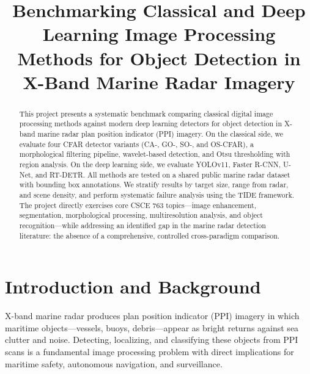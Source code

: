 \documentclass[conference]{IEEEtran}
\title{Benchmarking Classical and Deep Learning Image Processing Methods for Object Detection in X-Band Marine Radar Imagery}
\author{
\IEEEauthorblockN{JC Vaught and Ty Dangerfield}
\IEEEauthorblockA{CSCE 763: Digital Image Processing --- Spring 2026\\
University of South Carolina\\
\{jvaught, tdangerf\}@email.sc.edu}
}
\begin{document}
\maketitle

\begin{abstract}
This project presents a systematic benchmark comparing classical digital image processing methods against modern deep learning detectors for object detection in X-band marine radar plan position indicator (PPI) imagery. On the classical side, we evaluate four CFAR detector variants (CA-, GO-, SO-, and OS-CFAR), a morphological filtering pipeline, wavelet-based detection, and Otsu thresholding with region analysis. On the deep learning side, we evaluate YOLOv11, Faster R-CNN, U-Net, and RT-DETR. All methods are tested on a shared public marine radar dataset with bounding box annotations. We stratify results by target size, range from radar, and scene density, and perform systematic failure analysis using the TIDE framework. The project directly exercises core CSCE 763 topics---image enhancement, segmentation, morphological processing, multiresolution analysis, and object recognition---while addressing an identified gap in the marine radar detection literature: the absence of a comprehensive, controlled cross-paradigm comparison.
\end{abstract}

\section{Introduction and Background}

X-band marine radar produces plan position indicator (PPI) imagery in which maritime objects---vessels, buoys, debris---appear as bright returns against sea clutter and noise. Detecting, localizing, and classifying these objects from PPI scans is a fundamental image processing problem with direct implications for maritime safety, autonomous navigation, and surveillance.
\end{document}
